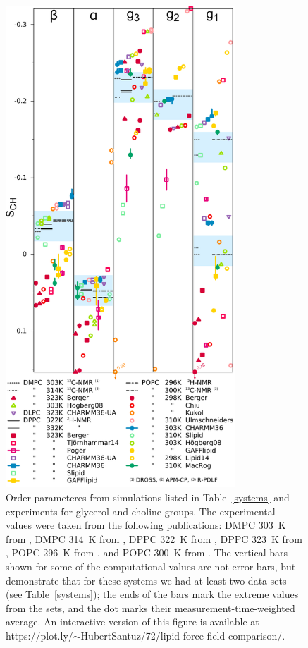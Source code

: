 \documentclass[journal=jpcbfk,manuscript=article]{achemso}
\begin{document}
\begin{figure}[]
  \includegraphics[width=8.6cm]{../DATAreportediINblog/comparisonSorted.pdf}
\newline
  \caption{\label{HGorderparameters}
  Order parameteres from simulations listed in Table~\ref{systems} and experiments for glycerol and choline groups.
The experimental values were taken from the following publications:
 DMPC 303~K from \cite{gross97},
 DMPC 314~K from \cite{dvinskikh05a},
 DPPC 322~K from \cite{gally75},
 DPPC 323~K from \cite{akutsu81},
 POPC 296~K from \cite{bechinger91}, and
 POPC 300~K from \cite{ferreira13}.
  The vertical bars shown for some of the computational values are not error bars, but demonstrate that for 
these systems we had at least two data sets (see Table~\ref{systems});
the ends of the bars mark the extreme values from the sets, and the dot marks their measurement-time-weighted average. 
An interactive version of this figure is available at  https://plot.ly/$\sim$HubertSantuz/72/lipid-force-field-comparison/.
} 
\end{figure}
\end{document}
